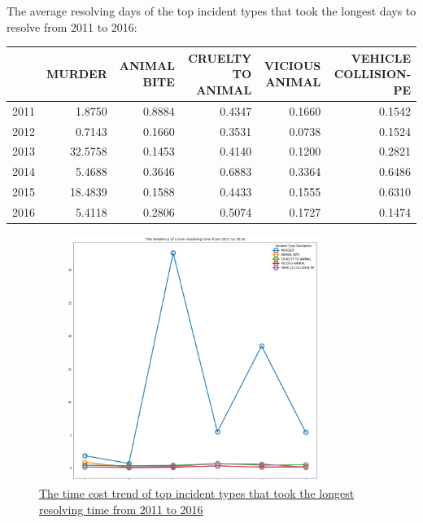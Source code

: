 \documentclass{article} %
\begin{document}
The average resolving days of the top incident types that took the longest days to resolve from 2011 to 2016:

\begin{center}
\begin{tabular}{|l|r|r|r|r|r|}
	\toprule
	 &   MURDER &  ANIMAL BITE &  CRUELTY TO ANIMAL &  VICIOUS ANIMAL &  VEHICLE COLLISION-PE \\
	\midrule
	2011 &   1.8750 &       0.8884 &             0.4347 &          0.1660 &                0.1542 \\
	2012 &   0.7143 &       0.1660 &             0.3531 &          0.0738 &                0.1524 \\
	2013 &  32.5758 &       0.1453 &             0.4140 &          0.1200 &                0.2821 \\
	2014 &   5.4688 &       0.3646 &             0.6883 &          0.3364 &                0.6486 \\
	2015 &  18.4839 &       0.1588 &             0.4433 &          0.1555 &                0.6310 \\
	2016 &   5.4118 &       0.2806 &             0.5074 &          0.1727 &                0.1474 \\
	\bottomrule
\end{tabular}
\end{center}

\begin{figure}[H]
	\begin{center}
		\includegraphics[height=8cm, width=10cm]{6.png}
	\end{center}
	\caption{\hyperref[appendix:plot4]{The time cost trend of top incident types that took the longest resolving time  from 2011 to 2016}}
\end{figure}
\end{document}

